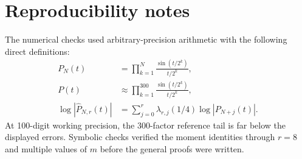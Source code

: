 \documentclass[11pt]{article}
\numberwithin{equation}{section}
\theoremstyle{definition}
\theoremstyle{remark}
\begin{document}
\section{Reproducibility notes}
\label{p8:app:repro}

The numerical checks used arbitrary-precision arithmetic with the following direct definitions:
\begin{align*}
P_N(t)&=\prod_{k=1}^{N}\frac{\sin(t/2^k)}{t/2^k},\\
P(t)&\approx\prod_{k=1}^{300}\frac{\sin(t/2^k)}{t/2^k},\\
\log|\widehat P_{N,r}(t)|
&=\sum_{j=0}^{r}\lambda_{r,j}(1/4)\log|P_{N+j}(t)|.
\end{align*}
At 100-digit working precision, the 300-factor reference tail is far below the displayed errors. Symbolic checks verified the moment identities through $r=8$ and multiple values of $m$ before the general proofs were written.
\end{document}
